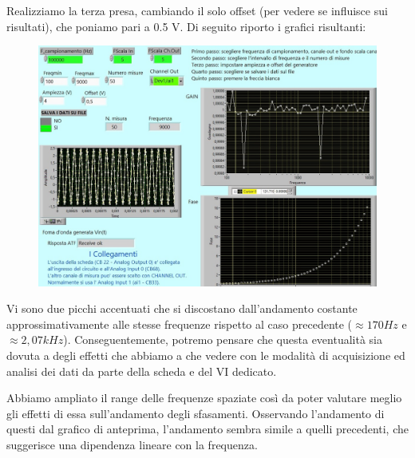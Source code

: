 Realizziamo la terza presa, cambiando il solo offset (per vedere se influisce sui risultati), che poniamo pari a 0.5 V. Di seguito riporto i grafici risultanti:
\begin{figure}[H]
\caption{}
    \includegraphics[width=12cm]{settimana_2/immagini/corto_3.jpg}
    \centering
\end{figure}
Vi sono due picchi accentuati che si discostano dall'andamento costante approssimativamente alle stesse frequenze rispetto al caso precedente ($\approx{170Hz}$ e $\approx{2,07kHz}$). Conseguentemente, potremo pensare che questa eventualità sia dovuta a degli effetti che abbiamo a che vedere con le modalità di acquisizione ed analisi dei dati da parte della scheda e del VI dedicato.


Abbiamo ampliato il range delle frequenze spaziate così da poter valutare meglio gli effetti di essa sull'andamento degli sfasamenti. Osservando l'andamento di questi dal grafico di anteprima, l'andamento sembra simile a quelli precedenti, che suggerisce una dipendenza lineare con la frequenza.

